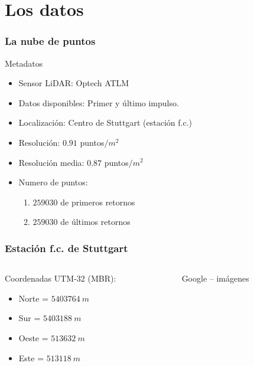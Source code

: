 \section{Los datos}
\begin{frame}
\frametitle{La nube de puntos}
Metadatos
\begin{itemize}
 \item Sensor LiDAR: \alert{Optech ATLM}
 \item Datos disponibles: Primer y último impulso.
 \item Localización: Centro de Stuttgart (estación f.c.)
 \item Resolución: $0.91$ puntos$/m^2$ 
 \item Resolución media: $0.87$ puntos$/m^2$
 \item Numero de puntos: 
  \begin{enumerate}
    \item $259030$ de primeros retornos
    \item $259030$ de últimos retornos
   \end{enumerate}
\end{itemize}
\end{frame}
\begin{frame}
\frametitle{Estación f.c. de Stuttgart}
 \begin{columns}
  \begin{column}{0.45\textwidth}
	Coordenadas UTM-32 (MBR):
	\begin{itemize}
	 \item Norte = $5403764~m$
	 \item Sur = $5403188~m$
	 \item Oeste = $513632~m$
	 \item Este = $513118~m$
	\end{itemize}
   \end{column}
  \begin{column}{0.55\textwidth}
    \begin{center}
	\tiny{ Google -- imágenes}
    \end{center}
   \end{column}
 \end{columns}
\end{frame}
